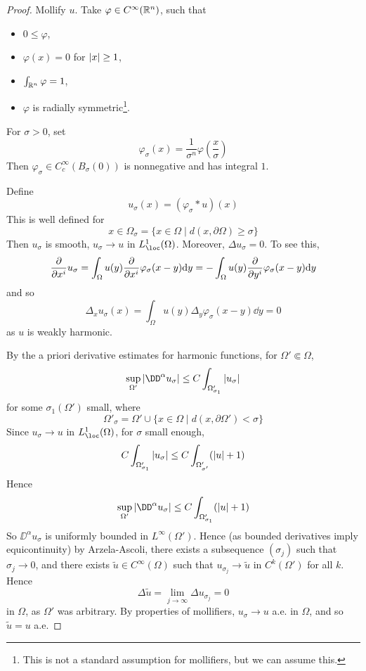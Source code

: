 \documentclass{article}
\begin{document}
\begin{proof}
    Mollify \(u\). Take \(\varphi \in C^\infty(\mathbb{R}^n)\), such that
    \begin{itemize}
        \item \(0 \le \varphi\),
        \item \(\varphi(x) = 0\) for \(\abs{x} \ge 1\),
        \item \(\int_{\mathbb{R}^n}\varphi = 1\),
        \item \(\varphi\) is radially symmetric\footnote{This is not a standard assumption for mollifiers, but we can assume this.}.
    \end{itemize}
    For \(\sigma > 0\), set
    \[\varphi_\sigma(x) = \frac{1}{\sigma^n}\varphi\left(\frac{x}{\sigma}\right)\]
    Then \(\varphi_\sigma \in C_c^\infty(B_\sigma(0))\) is nonnegative and has integral \(1\).

    Define
    \[u_\sigma(x) = (\varphi_\sigma * u)(x)\]
    This is well defined for
    \[x \in \Omega_\sigma = \{x \in \Omega \mid d(x, \partial\Omega) \ge \sigma\}\]
    Then \(u_\sigma\) is smooth, \(u_\sigma \to u\) in \(L^1_\loc(\Omega)\). Moreover, \(\Delta u_\sigma = 0\). To see this,
    \[\pdv{x^i}u_\sigma = \int_\Omega u(y)\pdv{x^i}\varphi_\sigma(x - y)\dd y = -\int_\Omega u(y)\pdv{y^i}\varphi_\sigma(x - y)\dd y\]
    and so
    \[\Delta_x u_\sigma(x) = \int_\Omega u(y)\Delta_y \varphi_\sigma(x - y)\dd y = 0\]
    as \(u\) is weakly harmonic.

    By the a priori derivative estimates for harmonic functions, for \(\Omega' \Subset \Omega\),
    \[\sup_{\Omega'}\abs{\DD^\alpha u_\sigma} \le C \int_{\Omega'_{\sigma_1}}\abs{u_\sigma}\]
    for some \(\sigma_1(\Omega')\) small, where
    \[\Omega'_\sigma = \Omega' \cup \{x \in \Omega \mid d(x, \partial\Omega') < \sigma\}\]
    Since \(u_\sigma \to u\) in \(L^1_\loc(\Omega)\), for \(\sigma\) small enough,
    \[C \int_{\Omega'_{\sigma_1}}\abs{u_\sigma} \le C\int_{\Omega'_{\sigma'}}(\abs{u} + 1)\]
    Hence
    \[\sup_{\Omega'}\abs{\DD^\alpha u_\sigma} \le C\int_{\Omega'_{\sigma_1}}(\abs{u} + 1)\]
    So \(\DD^\alpha u_\sigma\) is uniformly bounded in \(L^\infty(\Omega')\). Hence (as bounded derivatives imply equicontinuity) by Arzela-Ascoli, there exists a subsequence \((\sigma_j)\) such that \(\sigma_j \to 0\), and there exists \(\widetilde u \in C^\infty(\Omega)\) such that \(u_{\sigma_j} \to \widetilde u\) in \(C^k(\Omega')\) for all \(k\). Hence
    \[\Delta \widetilde u = \lim_{j \to \infty} \Delta u_{\sigma_j} = 0\]
    in \(\Omega\), as \(\Omega'\) was arbitrary. By properties of mollifiers, \(u_\sigma \to u\) a.e. in \(\Omega\), and so \(\widetilde u = u\) a.e.
\end{proof}
\end{document}
